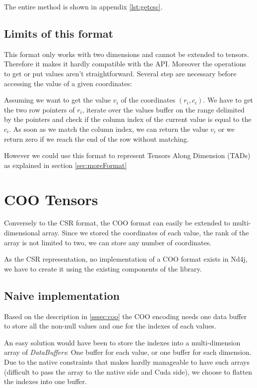 The entire method is shown in appendix \ref{lst:getcsc}.

\subsection{Limits of this format}

This format only works with two dimensions and cannot be extended to tensors. Therefore it makes it hardly compatible with the API.
Moreover the operations to get or put values aren't straightforward. Several step are necessary before accessing the value of a given coordinates:

Assuming we want to get the value $v_{i}$ of the coordinates $(r_{i}, c_{i})$.
 We have to get the two row pointers of $r_{i}$, iterate over the values buffer on the range delimited by the pointers and check if the column index of the current value is equal to the $c_{i}$. As soon as we match the column index, we can return the value $v_{i}$ or we return zero if we reach the end of the row without matching.

However we could use this format to represent Tensors Along Dimension (TADs) as explained in section \ref{sec:moreFormat}

\section{COO Tensors}

Conversely to the CSR format, the COO format can easily be extended to multi-dimensional array. Since we stored the coordinates of each value, the rank of the array is not limited to two, we can store any number of coordinates.
 
As the CSR representation, no implementation of a COO format exists in Nd4j, we have to create it using the existing components of the library.

\subsection{Naive implementation} \label{ssec:naiveCoo}

Based on the description in \ref{sssec:coo} the COO encoding needs one data buffer to store all the non-null values and one for the indexes of each values. 

An easy solution would have been to store the indexes into a multi-dimension array of \textit{DataBuffers}: One buffer for each value, or one buffer for each dimension. Due to the native constraints that makes hardly manageable to have such arrays (difficult to pass the array to the native side and Cuda side), we choose to flatten the indexes into one buffer.

